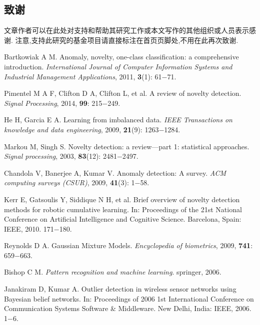 \documentclass{Style/aas}
\begin{document}
\begin{multicols}{2}
  \section*{致谢}

  文章作者可以在此处对支持和帮助其研究工作或本文写作的其他组织或人员表示感谢.
  注意,支持此研究的基金项目请直接标注在首页页脚处,不用在此再次致谢.

  

  \begin{thebibliography}{99}
     \addtolength{\itemsep}{0.2em} 
    
     Bartkowiak A M. Anomaly, novelty, one-class classification: a comprehensive introduction. {\sl International Journal of Computer Information Systems and Industrial Management Applications}, 2011, {\bf 3}(1): 61$-$71.

     Pimentel M A F, Clifton D A, Clifton L, et al. A review of novelty detection. {\sl Signal Processing}, 2014, {\bf 99}: 215$-$249.

     He H, Garcia E A. Learning from imbalanced data. {\sl IEEE Transactions on knowledge and data engineering}, 2009, {\bf 21}(9): 1263$-$1284.

     Markou M, Singh S. Novelty detection: a review—part 1: statistical approaches. {\sl Signal processing}, 2003, {\bf 83}(12): 2481$-$2497.

     Chandola V, Banerjee A, Kumar V. Anomaly detection: A survey. {\sl ACM computing surveys (CSUR)}, 2009, {\bf 41}(3): 1$-$58.

     Kerr E, Gatsoulis Y, Siddique N H, et al. Brief overview of novelty detection methods for robotic cumulative learning. In: Proceedings of the 21st National Conference on Artificial Intelligence and Cognitive Science. Barcelona, Spain: IEEE, 2010. 171$-$180.

     Reynolds D A. Gaussian Mixture Models. {\sl Encyclopedia of biometrics}, 2009,  {\bf 741}: 659$-$663.

     Bishop C M. {\sl Pattern recognition and machine learning}. springer, 2006.

     Janakiram D, Kumar A. Outlier detection in wireless sensor networks using Bayesian belief networks. In: Proceedings of 2006 1st International Conference on Communication Systems Software \& Middleware. New Delhi, India: IEEE, 2006. 1$-$6.


\end{thebibliography}
\end{multicols}
\end{document}
